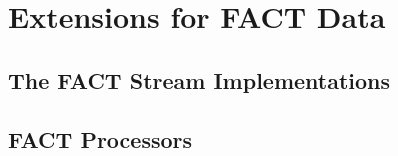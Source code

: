 \section{\label{sec:factAPI}Extensions for FACT Data}

\subsection{\label{api:fact:io}The FACT Stream Implementations}

\subsection{\label{api:fact:data}FACT Processors}



